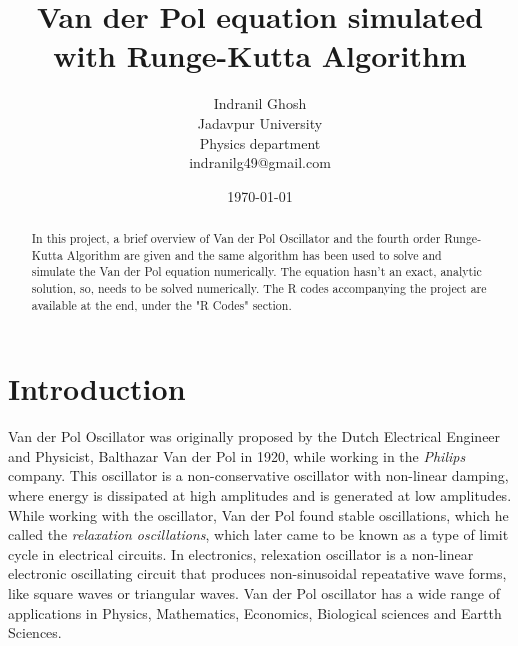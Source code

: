 \documentclass{article}
\title{Van der Pol equation simulated with Runge-Kutta Algorithm}
\author{Indranil Ghosh\\Jadavpur University\\Physics department\\indranilg49@gmail.com}
\date{\today}
\begin{document}
\maketitle
\begin{abstract}
In this project, a brief overview of Van der Pol Oscillator and the fourth order Runge-Kutta Algorithm are given and the same algorithm has been used to solve and simulate the Van der Pol equation numerically. The equation hasn't an exact, analytic solution, so, needs to be solved numerically. The R codes accompanying the project are available at the end, under the "R Codes" section.
\end{abstract}
\section{Introduction}
Van der Pol Oscillator was originally proposed by the Dutch Electrical Engineer and Physicist, Balthazar Van der Pol in 1920, while working in the \textit{Philips} company. This oscillator is a non-conservative oscillator with non-linear damping, where energy is dissipated at high amplitudes and is generated at low amplitudes. While working with the oscillator, Van der Pol found stable oscillations, which he called the \textit{relaxation oscillations}, which later came to be known as a type of limit cycle in electrical circuits. In electronics, relexation oscillator is a non-linear electronic oscillating circuit that produces non-sinusoidal repeatative wave forms, like square waves or triangular waves.  Van der Pol oscillator has a wide range of applications in Physics, Mathematics, Economics, Biological sciences and Eartth Sciences.
\end{document}
